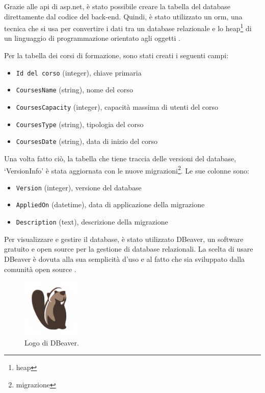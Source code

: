 Grazie alle \acrshort{api} di \acrshort{asp.net}, è stato possibile creare la tabella del database direttamente dal codice del back-end. Quindi, è stato utilizzato un \acrfull{orm}, una tecnica che si usa per convertire i dati tra un database relazionale e lo heap\footnote{\glsdesc{heap}} di un linguaggio di programmazione orientato agli oggetti \cite{articleORM}.

Per la tabella dei corsi di formazione, sono stati creati i seguenti campi: 
\begin{itemize}
  \item \texttt{Id del corso} (integer), chiave primaria
  \item \texttt{CoursesName} (string), nome del corso
  \item \texttt{CoursesCapacity} (integer), capacità massima di utenti del corso
  \item \texttt{CoursesType} (string), tipologia del corso
  \item \texttt{CoursesDate} (string), data di inizio del corso
\end{itemize}

Una volta fatto ciò, la tabella che tiene traccia delle versioni del database, `VersionInfo' è stata aggiornata con le nuove migrazioni\footnote{\glsdesc{migrazione}}. Le sue colonne sono:
\begin{itemize}
  \item \texttt{Version} (integer), versione del database
  \item \texttt{AppliedOn} (datetime), data di applicazione della migrazione
  \item \texttt{Description} (text), descrizione della migrazione
\end{itemize}

Per visualizzare e gestire il database, è stato utilizzato DBeaver, un software gratuito e open source per la gestione di database relazionali. La scelta di usare DBeaver è dovuta alla sua semplicità d'uso e al fatto che sia sviluppato dalla comunità open source \cite{dbeaver}.

\begin{figure}[H]
\centering
\includegraphics[width=0.25\textwidth]{Images/dbeaver.png}
\caption{\label{fig:dbeaver}Logo di DBeaver.}
\end{figure}


